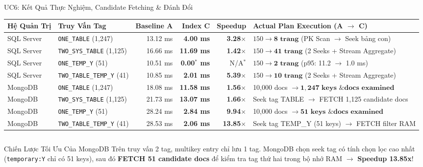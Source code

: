 \documentclass[aspectratio=169,9pt]{beamer}
\begin{document}
\begin{frame}{UC6: Kết Quả Thực Nghiệm, Candidate Fetching \& Đánh Đổi}
\begin{table}
\centering\footnotesize
\begin{tabularx}{\linewidth}{@{}l l r r r X@{}}
\toprule
\textbf{Hệ Quản Trị} & \textbf{Truy Vấn Tag} & \textbf{Baseline A} & \textbf{Index C} & \textbf{Speedup} & \textbf{Actual Plan Execution (A $\to$ C)} \\
\midrule
SQL Server & \texttt{ONE\_TABLE} (1,247) & 13.12 ms & \textbf{4.00 ms} & \textbf{3.28$\times$} & $150 \to \mathbf{8\text{ trang}}$ (PK Scan $\to$ Seek bảng con) \\
SQL Server & \texttt{TWO\_SYS\_TABLE} (1,125) & 16.66 ms & \textbf{11.69 ms} & \textbf{1.42$\times$} & $150 \to \mathbf{41\text{ trang}}$ (2 Seeks + Stream Aggregate) \\
SQL Server & \texttt{ONE\_TEMP\_Y} (51) & 10.51 ms & \textbf{0.00$^*$ ms} & N/A$^*$ & $150 \to \mathbf{2\text{ trang}}$ (p95: 11.2 $\to$ 1.0 ms) \\
SQL Server & \texttt{TWO\_TABLE\_TEMP\_Y} (41) & 10.85 ms & \textbf{2.01 ms} & \textbf{5.39$\times$} & $150 \to \mathbf{10\text{ trang}}$ (2 Seeks + Stream Aggregate) \\
\midrule
MongoDB & \texttt{ONE\_TABLE} (1,247) & 18.08 ms & \textbf{11.58 ms} & \textbf{1.56$\times$} & 10,000 docs $\to \mathbf{1,247\text{ keys \& docs examined}}$ \\
MongoDB & \texttt{TWO\_SYS\_TABLE} (1,125) & 21.73 ms & \textbf{13.07 ms} & \textbf{1.66$\times$} & Seek tag TABLE $\to$ FETCH 1,125 candidate docs \\
MongoDB & \texttt{ONE\_TEMP\_Y} (51) & 28.24 ms & \textbf{2.84 ms} & \textbf{9.94$\times$} & 10,000 docs $\to \mathbf{51\text{ keys \& docs examined}}$ \\
MongoDB & \texttt{TWO\_TABLE\_TEMP\_Y} (41) & 28.53 ms & \textbf{2.06 ms} & \textbf{13.85$\times$} & Seek tag TEMP\_Y (51 keys) $\to$ FETCH filter RAM \\
\bottomrule
\end{tabularx}
\end{table}

\vspace{-0.2cm}
\begin{columns}[T]
\begin{column}{0.48\textwidth}
\begin{block}{Chiến Lược Tối Ưu Của MongoDB}
\scriptsize
Trên truy vấn 2 tag, multikey entry chỉ lưu 1 tag. MongoDB chọn seek tag có tính chọn lọc cao nhất (\texttt{temporary:Y} chỉ có 51 keys), sau đó \textbf{FETCH 51 candidate docs} để kiểm tra tag thứ hai trong bộ nhớ RAM $\to$ \textbf{Speedup 13.85x}!
\end{block}
\end{column}


\end{columns}
\end{frame}
\end{document}
